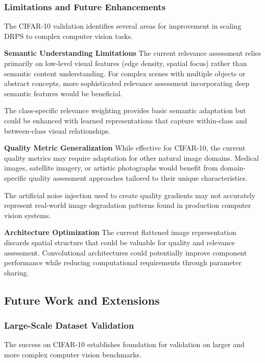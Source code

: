 \documentclass[12pt]{article}
\begin{document}
\subsubsection{Limitations and Future Enhancements}\label{limitations}

The CIFAR-10 validation identifies several areas for improvement in scaling DRPS to complex computer vision tasks.

\textbf{Semantic Understanding Limitations}
The current relevance assessment relies primarily on low-level visual features (edge density, spatial focus) rather than semantic content understanding. For complex scenes with multiple objects or abstract concepts, more sophisticated relevance assessment incorporating deep semantic features would be beneficial.

The class-specific relevance weighting provides basic semantic adaptation but could be enhanced with learned representations that capture within-class and between-class visual relationships.

\textbf{Quality Metric Generalization}
While effective for CIFAR-10, the current quality metrics may require adaptation for other natural image domains. Medical images, satellite imagery, or artistic photographs would benefit from domain-specific quality assessment approaches tailored to their unique characteristics.

The artificial noise injection used to create quality gradients may not accurately represent real-world image degradation patterns found in production computer vision systems.

\textbf{Architecture Optimization}
The current flattened image representation discards spatial structure that could be valuable for quality and relevance assessment. Convolutional architectures could potentially improve component performance while reducing computational requirements through parameter sharing.

\subsection{Future Work and Extensions}\label{future-work}

\subsubsection{Large-Scale Dataset Validation}\label{large-scale}

The success on CIFAR-10 establishes foundation for validation on larger and more complex computer vision benchmarks.
\end{document}
